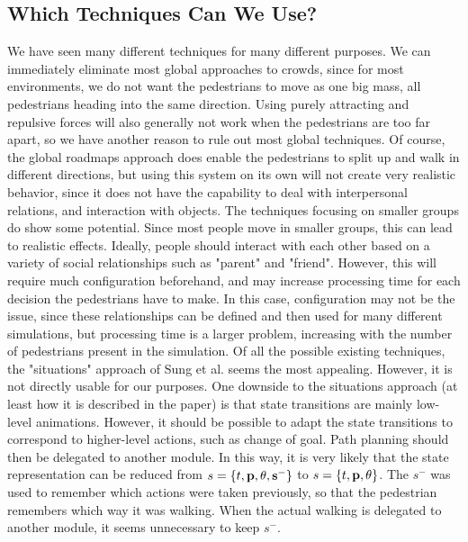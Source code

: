\documentclass[11pt]{article}
\begin{document}
\subsection{Which Techniques Can We Use?}
We have seen many different techniques for many different purposes. We can immediately eliminate most global approaches to  crowds, since for most environments, we do not want the pedestrians to move as one big mass, all pedestrians heading into the same direction. Using purely attracting and repulsive forces will also generally not work when the pedestrians are too far apart, so we have another reason to rule out most global techniques. Of course, the global roadmaps approach does enable the pedestrians to split up and walk in different directions, but using this system on its own will not create very realistic behavior, since it does not have the capability to deal with interpersonal relations, and interaction with objects.
The techniques focusing on smaller groups do show some potential. Since most people move in smaller groups, this can lead to realistic effects. Ideally, people should interact with each other based on a variety of social relationships such as "parent" and "friend". However, this will require much configuration beforehand, and may increase processing time for each decision the pedestrians have to make. In this case, configuration may not be the issue, since these relationships can be defined and then used for many different simulations, but processing time is a larger problem, increasing with the number of pedestrians present in the simulation.
Of all the possible existing techniques, the "situations" approach of Sung et al. seems the most appealing. However, it is not directly usable for our purposes. One downside to the situations approach (at least how it is described in the paper) is that state transitions are mainly low-level animations. However, it should be possible to adapt the state transitions to correspond to higher-level actions, such as change of goal. Path planning should then be delegated to another module. In this way, it is very likely that the state representation can be reduced from $s = \{t, \bf{p}, \theta, s^- \}$ to $s = \{t, \bf{p}, \theta\}$. The $s^-$ was used to remember which actions were taken previously, so that the pedestrian remembers which way it was walking. When the actual walking is delegated to another module, it seems unnecessary to keep $s^-$.
\end{document}
